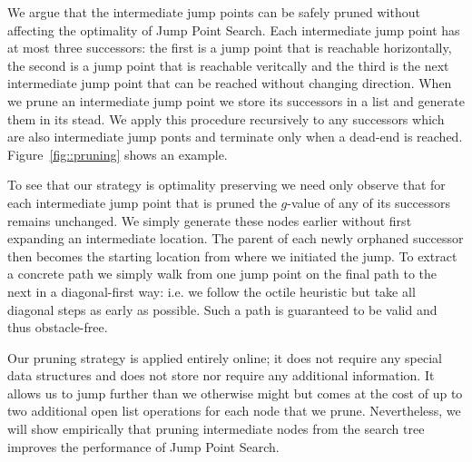 We argue that the intermediate jump points can be safely pruned without
affecting the optimality of Jump Point Search.  
Each intermediate jump point has at most three successors: the first is a jump 
point that is reachable horizontally, the second is a jump point that is reachable 
veritcally and the third is the next intermediate jump point that can be reached 
without changing direction.
When we prune an intermediate jump point we store its successors in a list and
generate them in its stead. We apply this procedure recursively to any
successors which are also intermediate jump ponts and terminate only when a
dead-end is reached. Figure~\ref{fig::pruning} shows an example.

To see that our strategy is optimality preserving we need only observe that
for each intermediate jump point that is pruned the $g$-value of any of its
successors remains unchanged. We simply generate these nodes earlier without
first expanding an intermediate location.  The parent of each newly orphaned
successor then becomes the starting location from where we initiated the jump. To
extract a concrete path we simply walk from one jump point on the final
path to the next in a diagonal-first way: i.e. we follow the octile heuristic but 
take all diagonal steps as early as possible. Such a path is guaranteed to be 
valid and thus obstacle-free.

Our pruning strategy is applied entirely online; it does not require any
special data structures and does not store nor require any additional
information.  It allows us to jump further than we otherwise might but comes
at the cost of up to two additional open list operations for each node that we
prune. Nevertheless, we will show empirically that pruning intermediate nodes
from the search tree improves the performance of Jump Point Search.
